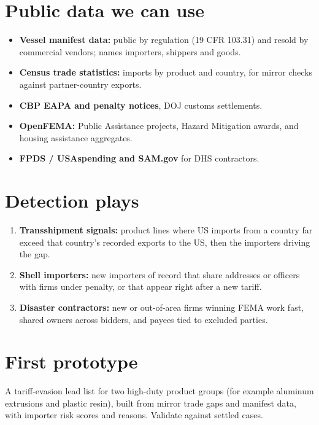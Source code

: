 \documentclass[letterpaper,11pt]{article}
\providecommand{\tightlist}{\setlength{\itemsep}{0pt}\setlength{\parskip}{0pt}}
\begin{document}
\hypertarget{public-data-we-can-use}{%
\section{Public data we can use}\label{public-data-we-can-use}}

\begin{itemize}
\tightlist
\item
  \textbf{Vessel manifest data:} public by regulation (19 CFR 103.31)
  and resold by commercial vendors; names importers, shippers and goods.
\item
  \textbf{Census trade statistics:} imports by product and country, for
  mirror checks against partner-country exports.
\item
  \textbf{CBP EAPA and penalty notices}, DOJ customs settlements.
\item
  \textbf{OpenFEMA:} Public Assistance projects, Hazard Mitigation
  awards, and housing assistance aggregates.
\item
  \textbf{FPDS / USAspending and SAM.gov} for DHS contractors.
\end{itemize}

\hypertarget{detection-plays}{%
\section{Detection plays}\label{detection-plays}}

\begin{enumerate}
\def\labelenumi{\arabic{enumi}.}
\tightlist
\item
  \textbf{Transshipment signals:} product lines where US imports from a
  country far exceed that country's recorded exports to the US, then the
  importers driving the gap.
\item
  \textbf{Shell importers:} new importers of record that share addresses
  or officers with firms under penalty, or that appear right after a new
  tariff.
\item
  \textbf{Disaster contractors:} new or out-of-area firms winning FEMA
  work fast, shared owners across bidders, and payees tied to excluded
  parties.
\end{enumerate}

\hypertarget{first-prototype}{%
\section{First prototype}\label{first-prototype}}

A tariff-evasion lead list for two high-duty product groups (for example
aluminum extrusions and plastic resin), built from mirror trade gaps and
manifest data, with importer risk scores and reasons. Validate against
settled cases.
\end{document}
